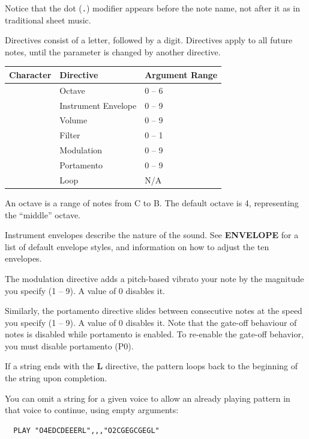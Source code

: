 \begin{description}[leftmargin=2cm,style=nextline]
Notice that the dot ({\tt .}) modifier appears before the note name, not after
it as in traditional sheet music.

Directives consist of a letter, followed by a digit. Directives apply to all
future notes, until the parameter is changed by another directive.

\begin{center}
{\setlength{\tabcolsep}{1mm}
\begin{tabular}{*{1}{|C{9mm}}|l|l|}
\hline
{\bf Character}  & {\bf Directive} & {\bf Argument Range} \\
\hline
{} & Octave              & 0 -- 6 \\
 & Instrument Envelope & 0 -- 9 \\
 & Volume              & 0 -- 9 \\
 & Filter              & 0 -- 1 \\
 & Modulation          & 0 -- 9 \\
 & Portamento          & 0 -- 9 \\
 & Loop                & N/A   \\
\hline
\end{tabular}
}
\end{center}

  An octave is a range of notes from C to B. The default octave is 4,
  representing the ``middle'' octave.

  Instrument envelopes describe the nature of the sound. See {\bf ENVELOPE}
  for a list of default envelope styles, and information on how to adjust the
  ten envelopes.

  The modulation directive adds a pitch-based vibrato your note by the magnitude you
  specify (1 -- 9). A value of 0 disables it.

  Similarly, the portamento directive slides between consecutive
  notes at the speed you specify (1 -- 9). A value of 0 disables it. Note that
  the gate-off behaviour of notes is disabled while portamento is enabled.
  To re-enable the gate-off behavior, you must disable portamento (P0).

  If a string ends with the {\bf L} directive, the pattern loops back to the
  beginning of the string upon completion.

  You can omit a string for a given voice to allow an already playing pattern
  in that voice to continue, using empty arguments:

\begin{tcolorbox}[colback=black,coltext=white]
\verbatimfont{\codefont}
\begin{verbatim}
  PLAY "O4EDCDEEERL",,,"O2CGEGCGEGL"
\end{verbatim}
\end{tcolorbox}


\end{description}
